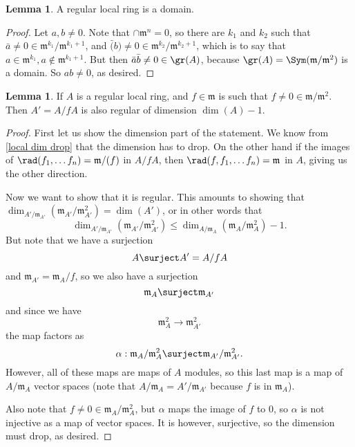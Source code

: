 \documentclass[12 pt]{article}
\theoremstyle{definition}
\newtheorem{lemma}[theorem]{Lemma}
\begin{document}
\begin{lemma} A regular local ring is a domain.
\label{reg loc means domain}
\end{lemma}
\begin{proof} Let $a,b \neq 0$. Note that $\cap \mathfrak{m}^n=0$, so there are $k_1$ and $k_2$ such that $\bar{a} \neq 0 \in \mathfrak{m}^{k_1}/\mathfrak{m}^{k_1+1}$, and $\bar(b) \neq 0 \in \mathfrak{m}^{k_2}/\mathfrak{m}^{k_2+1}$, which is to say that $a \in \mathfrak{m}^{k_1}, a \not \in \mathfrak{m}^{k_1+1}$. But then $\bar{a}\bar{b} \neq 0 \in \gr(A)$, because $\gr(A)=\Sym(\mathfrak{m}/\mathfrak{m}^2)$ is a domain. So $ab \neq 0$, as desired.
\end{proof}


\begin{lemma}
If $A$ is a regular local ring, and $f \in \mathfrak{m}$ is such that $f \neq 0 \in \mathfrak{m}/\mathfrak{m}^2$. Then $A'=A/fA$ is also regular of dimension $\dim(A)-1$.
\label{reg loc mod f still reg loc}
\end{lemma}
\begin{proof} First let us show the dimension part of the statement. We know from \ref{local dim drop} that the dimension has to drop. On the other hand if the images of $\rad(f_1, \ldots f_n)=\mathfrak{m}/(f)$ in $A/fA$, then $\rad(f,f_1, \ldots f_n)=\mathfrak{m}$ in $A$, giving us the other direction.

Now we want to show that it is regular. This amounts to showing that $\dim_{A'/\mathfrak{m}_{A'}}(\mathfrak{m}_{A'}/\mathfrak{m}_{A'}^2)=\dim(A')$, or in other words that \[\dim_{A'/\mathfrak{m}_{A'}}(\mathfrak{m}_{A'}/\mathfrak{m}_{A'}^2) \leq \dim_{A/\mathfrak{m}_A}(\mathfrak{m}_{A}/\mathfrak{m}_A^2)-1.\]
But note that we have a surjection
\[A \surject A'=A/fA\]
and $\mathfrak{m}_{A'}=\mathfrak{m}_A/f$, so we also have a surjection
\[\mathfrak{m}_A \surject \mathfrak{m}_{A'}\]
and since we have
\[\mathfrak{m}_A^2 \to \mathfrak{m}_{A'}^2\]
the map factors as
\[\alpha: \mathfrak{m}_A/\mathfrak{m}_A^2 \surject \mathfrak{m}_{A'}/\mathfrak{m}_{A'}^2.\]
However, all of these maps are maps of $A$ modules, so this last map is a map of $A/\mathfrak{m}_A$ vector spaces (note that $A/\mathfrak{m}_A=A'/\mathfrak{m}_{A'}$ because $f$ is in $\mathfrak{m}_A$).

Also note that $f \neq 0 \in \mathfrak{m}_A/\mathfrak{m}_A^2$, but $\alpha$ maps the image of $f$ to 0, so $\alpha$ is not injective as a map of vector spaces. It is however, surjective, so the dimension must drop, as desired.
\end{proof}
\end{document}
